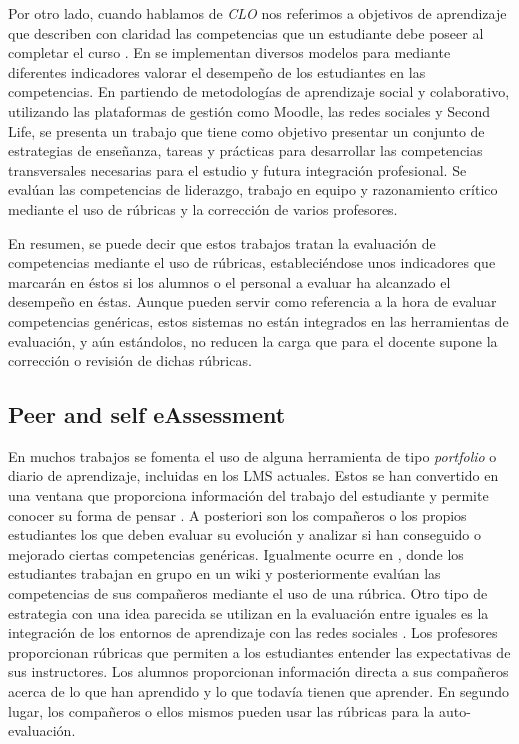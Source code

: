 Por otro lado, cuando hablamos de \emph{CLO} nos referimos a objetivos de aprendizaje que describen con claridad las competencias que un estudiante debe poseer al completar el curso \cite{SimonTaylor:2009, Anderson:2001,Kennedy:2007}. En \cite {Mohamed:2008,Mohamed:2008a,Rashid:2008} se implementan diversos modelos para mediante diferentes indicadores valorar el desempeño de los estudiantes en las competencias. En \cite{MercedesRico:2013} partiendo de metodologías de aprendizaje social y colaborativo, utilizando las plataformas de gestión como Moodle, las redes sociales y Second Life, se presenta un trabajo que tiene como objetivo presentar un conjunto de estrategias de enseñanza, tareas y prácticas para desarrollar las competencias transversales necesarias para el estudio y futura integración profesional. Se evalúan las competencias de liderazgo, trabajo en equipo y razonamiento crítico mediante el uso de rúbricas y la corrección de varios profesores.

En resumen, se puede decir que estos trabajos tratan la evaluación de competencias mediante el uso de rúbricas, estableciéndose unos indicadores que marcarán en éstos si los alumnos o el personal a evaluar ha alcanzado el desempeño en éstas. Aunque pueden servir como referencia a la hora de evaluar competencias genéricas, estos sistemas no están integrados en las herramientas de evaluación, y aún estándolos, no reducen la carga que para el docente supone la corrección o revisión de dichas rúbricas.

\subsection{Peer and self eAssessment}

En muchos trabajos se fomenta el uso de alguna herramienta de tipo \emph{portfolio} o diario de aprendizaje, incluidas en los LMS actuales. Estos se han convertido en una ventana que proporciona información del trabajo del estudiante y permite conocer su forma de pensar \cite{Palomares:2011,Gil:2011}. A posteriori son los compañeros o los propios estudiantes los que deben evaluar su evolución y analizar si han conseguido o mejorado ciertas competencias genéricas. Igualmente ocurre en \cite{Lim:2011}, donde los estudiantes trabajan en grupo en un wiki y posteriormente evalúan las competencias de sus compañeros mediante el uso de una rúbrica. Otro tipo de estrategia con una idea parecida se utilizan en la evaluación entre iguales es la integración de los entornos de aprendizaje con las redes sociales \cite{Piedra:2010,McLoughlin:2006,Shih:2011}. Los profesores proporcionan rúbricas que permiten a los estudiantes entender las expectativas de sus instructores. Los alumnos proporcionan información directa a sus compañeros acerca de lo que han aprendido y lo que todavía tienen que aprender. En segundo lugar, los compañeros o ellos mismos pueden usar las rúbricas para la auto-evaluación. 

